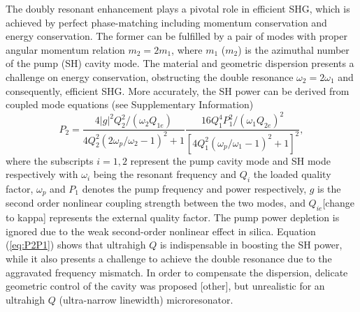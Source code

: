 \documentclass[a4paper,8pt,hyperref, twocolumn]{article}
\begin{document}

The doubly resonant enhancement plays a pivotal role in efficient SHG, which is achieved by perfect phase-matching including momentum conservation and energy conservation.
The former can be fulfilled by a pair of modes with proper angular momentum relation $m_2=2m_1$, where $m_1$ ($m_2$) is the azimuthal number of the pump (SH) cavity mode. 
The material and geometric dispersion presents a challenge on energy conservation, obstructing the double resonance $\omega_2=2\omega_1$ and consequently, efficient SHG. 
More accurately, the SH power can be derived from coupled mode equations (see Supplementary Information)%
\begin{equation}
P_2 = \frac{4|g|^2Q_2^2/(\omega_2Q_{1e})}{4Q_2^2(2\omega_p/\omega_2-1)^2+1}\frac{16Q_1^4P_1^2/(\omega_1Q_{2e})^2}{[4Q_1^2(\omega_p/\omega_1-1)^2+1]^2},
\label{eq:P2P1}
\end{equation}
where the subscripts $i=1, 2$  represent the pump cavity mode and SH mode respectively with $\omega_i$ being the resonant frequency and $Q_i$ the loaded quality factor, $\omega_p$ and $P_1$ denotes the pump frequency and power respectively, $g$ is the second order nonlinear coupling strength between the two modes, %
and $Q_{ie}$[change to kappa] represents the external quality factor. The pump power depletion is ignored due to the weak second-order nonlinear effect in silica.
Equation (\ref{eq:P2P1}) shows that ultrahigh $Q$ is indispensable in boosting the SH power, while it also presents a challenge to achieve the double resonance due to the aggravated frequency mismatch. %
In order to compensate the dispersion, delicate geometric control of the cavity was proposed \cite{kozyreff2008whispering}[other], but unrealistic for an ultrahigh $Q$ (ultra-narrow linewidth) microresonator.  %
\end{document}
